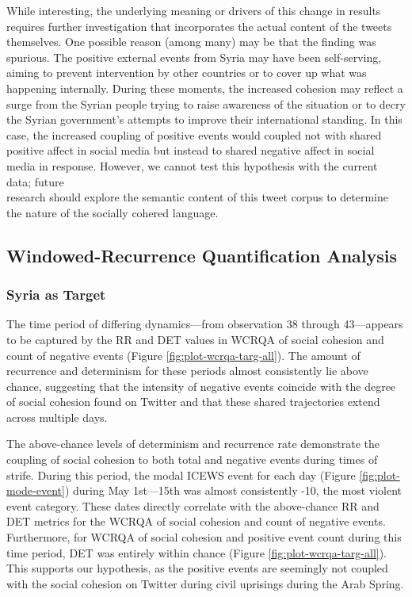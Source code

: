 \documentclass[english,man]{apa6}
\begin{document}
While interesting, the underlying meaning or drivers of this change
in results requires further investigation that incorporates the
actual content of the tweets themselves. One possible reason (among
many) may be that the finding was spurious. The positive external
events from Syria may have been self-serving, aiming to prevent intervention
by other countries or to cover up what was happening internally.
During these moments, the increased cohesion may reflect a surge from
the Syrian people trying to raise awareness of the situation or
to decry the Syrian government's attempts to improve their international
standing. In this case, the increased coupling of positive events would
coupled not with shared positive affect in social media but instead
to shared negative affect in social media in response. However, we
cannot test this hypothesis with the current data; future\\
research should explore the semantic content of this tweet
corpus to determine the nature of the socially cohered language.

\hypertarget{windowed-recurrence-quantification-analysis}{%
\subsection{Windowed-Recurrence Quantification Analysis}\label{windowed-recurrence-quantification-analysis}}

\hypertarget{syria-as-target-3}{%
\subsubsection{Syria as Target}\label{syria-as-target-3}}

The time period of differing dynamics---from observation 38 through
43---appears to be captured by the RR and DET values in
WCRQA of social cohesion and count of negative
events (Figure \ref{fig:plot-wcrqa-targ-all}). The
amount of recurrence and determinism for these periods almost consistently
lie above chance, suggesting that the intensity of negative events coincide
with the degree of social cohesion found on Twitter and that these
shared trajectories extend across multiple days.

The above-chance levels of determinism and recurrence rate demonstrate
the coupling of social cohesion to both total and negative events during
times of strife. During this period,
the modal ICEWS event for each day (Figure \ref{fig:plot-mode-event})
during May 1st---15th was almost consistently -10, the most violent
event category. These dates directly correlate with the above-chance RR and DET
metrics for the WCRQA of social cohesion and count of negative events.
Furthermore, for WCRQA of social cohesion and positive event count during
this time period, DET was entirely within chance (Figure
\ref{fig:plot-wcrqa-targ-all}). This supports our hypothesis, as the
positive events are seemingly not coupled with the social cohesion on Twitter
during civil uprisings during the Arab Spring.
\end{document}
